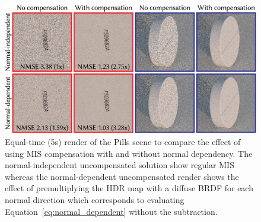 \begin{figure}
    \centering
    \includegraphics[width=.6\textwidth]{images/pills.png}
    \caption{Equal-time (5s) render of the Pills scene to compare the effect of using MIS compensation with and without normal dependency.
    The normal-independent uncompensated solution show regular MIS
    whereas the normal-dependent uncompensated render shows the effect of premultiplying the HDR map with a diffuse BRDF for each normal direction
    which corresponds to evaluating Equation~\ref{eq:normal_dependent} without the subtraction.
    \cite[Figure~9]{Karlik2019}}
    \label{fig:pills}
\end{figure}